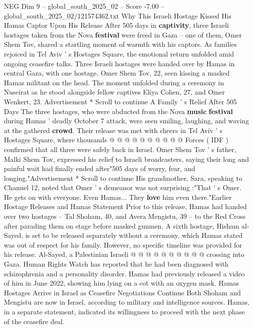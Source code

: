 \begin{textsample}{NEG Dim 9 – global\_south\_2025\_02 – Score -7.00 – global\_south\_2025\_02/121574362.txt}  \label{ex:f9_neg_190}
Why This Israeli Hostage Kissed His Hamas Captor Upon His Release After 505 days in \textbf{captivity}, three Israeli hostages taken from the Nova \textbf{festival} were freed in Gaza -- one of them, Omer Shem Tov, shared a startling moment of warmth with his captors.
As families rejoiced in Tel Aviv ' s Hostages Square, the emotional return unfolded amid ongoing ceasefire talks.
Three Israeli hostages were handed over by Hamas in central Gaza, with one hostage, Omer Shem Tov, 22, seen kissing a masked Hamas militant on the head.
The moment unfolded during a ceremony in Nuseirat as he stood alongside fellow captives Eliya Cohen, 27, and Omer Wenkert, 23.
Advertisement * Scroll to continue A Family ' s Relief After 505 Days The three hostages, who were abducted from the Nova \textbf{music} \textbf{festival} during Hamas ' deadly October 7 attack, were seen smiling, laughing, and waving at the gathered \textbf{crowd}.
Their release was met with cheers in Tel Aviv ' s Hostages Square, where thousands @ @ @ @ @ @ @ @ @ @ Forces ( IDF ) confirmed that all three were safely back in Israel.
Omer Shem Tov ' s father, Malki Shem Tov, expressed his relief to Israeli broadcasters, saying their long and painful wait had finally ended after"505 days of worry, fear, and longing."Advertisement * Scroll to continue His grandmother, Sara, speaking to Channel 12, noted that Omer ' s demeanor was not surprising :"That ' s Omer.
He gets on with everyone.
Even Hamas...
They \textbf{love} him even there."Earlier Hostage Releases and Hamas Statement Prior to this release, Hamas had handed over two hostages -- Tal Shoham, 40, and Avera Mengistu, 39 -- to the Red Cross after parading them on stage before masked gunmen.
A sixth hostage, Hisham al-Sayed, is set to be released separately without a ceremony, which Hamas stated was out of respect for his family.
However, no specific timeline was provided for his release.
Al-Sayed, a Palestinian Israeli @ @ @ @ @ @ @ @ @ @ crossing into Gaza.
Human Rights Watch has reported that he had been diagnosed with schizophrenia and a personality disorder.
Hamas had previously released a video of him in June 2022, showing him lying on a cot with an oxygen mask.
Hamas Hostages Arrive in Israel as Ceasefire Negotiations Continue Both Shoham and Mengistu are now in Israel, according to military and intelligence sources.
Hamas, in a separate statement, indicated its willingness to proceed with the next phase of the ceasefire deal.

\end{textsample}
